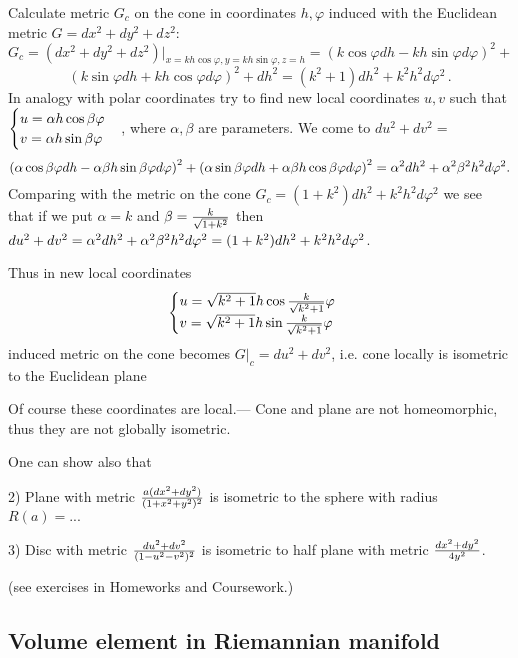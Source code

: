 \documentclass[12pt]{article}
\theoremstyle{theorem}
\numberwithin{equation}{section}
\begin{document}
Calculate  metric $G_c$ on the cone in coordinates $h,\varphi$  induced with
the Euclidean metric $G=dx^2+dy^2+dz^2$:
                $$
            G_c=\left(dx^2+dy^2+dz^2\right)\big\vert_{x=kh\cos\varphi, y=kh\sin\varphi, z=h}=
            (k\cos\varphi dh-kh\sin\varphi d\varphi)^2+
            $$
            $$
            (k\sin\varphi dh+kh\cos\varphi d\varphi)^2+dh^2=
            (k^2+1)dh^2+k^2h^2d\varphi^2\,.
                $$
In analogy with polar coordinates try to find new local coordinates $u,v$
such that $\begin{cases} u=\alpha h\cos \beta\varphi\cr v=\alpha h\sin \beta\varphi\end{cases}$,
where $\alpha, \beta$ are parameters. We come to  $du^2+dv^2=$
             $$
    \left(\alpha\cos\beta\varphi dh-\alpha\beta h\sin\beta\varphi d\varphi\right)^2+
  \left(\alpha\sin\beta\varphi dh+\alpha\beta h\cos\beta\varphi d\varphi\right)^2=
  \alpha^2 dh^2+\alpha^2\beta^2 h^2d\varphi^2.
             $$
Comparing with the metric on the cone $G_c=(1+k^2)dh^2+k^2h^2d\varphi^2$  we see that if we put $\alpha=k$ and
$\beta={k\over \sqrt{1+k^2}}$
then $du^2+dv^2=\alpha^2 dh^2+\alpha^2\beta^2 h^2d\varphi^2=(1+k^2)dh^2+k^2h^2d\varphi^2$.

Thus in new local coordinates
                  $$
                  \begin{cases}
             u= \sqrt {k^2+1}h\cos {k\over \sqrt {k^2+1}}\varphi\cr
             v=  \sqrt {k^2+1} h\sin {k\over \sqrt {k^2+1}}\varphi\cr
                  \end{cases}
                  $$
induced metric on the cone becomes
$G\vert_c= du^2+dv^2$, i.e. cone locally is isometric to the Euclidean plane \finish

Of course these coordinates are local.---  Cone and plane are not homeomorphic, thus they are not globally isometric.

\m

    One can show also that

      2) Plane with metric $a(dx^2+dy^2)\over (1+x^2+y^2)^2$ is isometric to the sphere with radius $R(a)=...$

    3) Disc with metric $du^2+dv^2\over (1-u^2-v^2)^2$ is isometric to half plane with metric $dx^2+dy^2\over 4y^2$.

(see exercises in Homeworks and Coursework.)


    \subsection {Volume element in Riemannian manifold}
\end{document}
